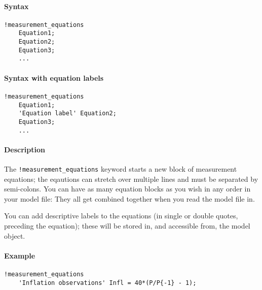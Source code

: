 


	\paragraph{Syntax}

\begin{verbatim}
!measurement_equations
    Equation1;
    Equation2;
    Equation3;
    ...
\end{verbatim}

\paragraph{Syntax with equation
labels}

\begin{verbatim}
!measurement_equations
    Equation1;
    'Equation label' Equation2;
    Equation3;
    ...
\end{verbatim}

\paragraph{Description}

The \texttt{!measurement\_equations} keyword starts a new block of
measurement equations; the eqautions can stretch over multiple lines and
must be separated by semi-colons. You can have as many equation blocks
as you wish in any order in your model file: They all get combined
together when you read the model file in.

You can add descriptive labels to the equations (in single or double
quotes, preceding the equation); these will be stored in, and accessible
from, the model object.

\paragraph{Example}

\begin{verbatim}
!measurement_equations
    'Inflation observations' Infl = 40*(P/P{-1} - 1);
\end{verbatim}


